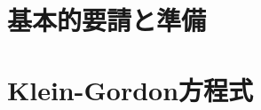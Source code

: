 \documentclass{report}
\begin{document}
  \chapter{基本的要請と準備}
    
  \chapter{Klein-Gordon方程式}
    
\end{document}
